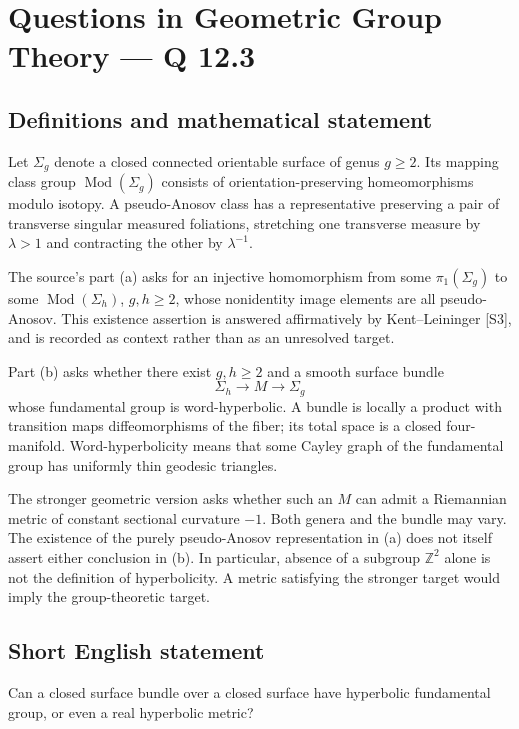 \documentclass[11pt,a4paper]{article}
\begin{document}
\section*{Questions in Geometric Group Theory — Q 12.3}\label{statement}

\subsection{Definitions and mathematical statement}
Let $\Sigma_g$ denote a closed connected orientable surface of genus $g\geq2$. Its mapping class group $\operatorname{Mod}(\Sigma_g)$ consists of orientation-preserving homeomorphisms modulo isotopy. A pseudo-Anosov class has a representative preserving a pair of transverse singular measured foliations, stretching one transverse measure by $\lambda>1$ and contracting the other by $\lambda^{-1}$.

The source's part (a) asks for an injective homomorphism from some $\pi_1(\Sigma_g)$ to some $\operatorname{Mod}(\Sigma_h)$, $g,h\geq2$, whose nonidentity image elements are all pseudo-Anosov. This existence assertion is answered affirmatively by Kent--Leininger [S3], and is recorded as context rather than as an unresolved target.

Part (b) asks whether there exist $g,h\geq2$ and a smooth surface bundle
\[
 \Sigma_h\longrightarrow M\longrightarrow\Sigma_g
\]
whose fundamental group is word-hyperbolic. A bundle is locally a product with transition maps diffeomorphisms of the fiber; its total space is a closed four-manifold. Word-hyperbolicity means that some Cayley graph of the fundamental group has uniformly thin geodesic triangles.

The stronger geometric version asks whether such an $M$ can admit a Riemannian metric of constant sectional curvature $-1$. Both genera and the bundle may vary. The existence of the purely pseudo-Anosov representation in (a) does not itself assert either conclusion in (b). In particular, absence of a subgroup $\mathbb Z^2$ alone is not the definition of hyperbolicity. A metric satisfying the stronger target would imply the group-theoretic target.
\subsection{Short English statement}
Can a closed surface bundle over a closed surface have hyperbolic fundamental group, or even a real hyperbolic metric?
\end{document}
